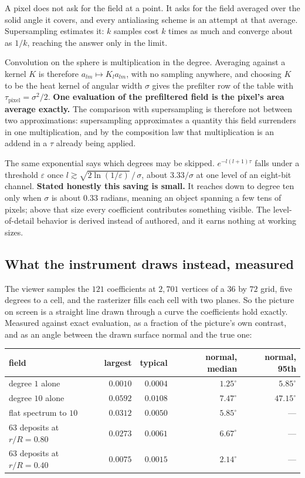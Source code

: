 A pixel does not ask for the field at a point. It asks for the field averaged over the solid angle it covers, and every antialiasing scheme is an attempt at that average. Supersampling estimates it: \(k\) samples cost \(k\) times as much and converge about as \(1/k\), reaching the answer only in the limit.

Convolution on the sphere is multiplication in the degree. Averaging against a kernel \(K\) is therefore \(a_{lm} \mapsto K_l a_{lm}\), with no sampling anywhere, and choosing \(K\) to be the heat kernel of angular width \(\sigma\) gives the prefilter row of the table with \(\tau_{\mathrm{pixel}} = \sigma^2/2\). \textbf{One evaluation of the prefiltered field is the pixel's area average exactly.} The comparison with supersampling is therefore not between two approximations: supersampling approximates a quantity this field surrenders in one multiplication, and by the composition law that multiplication is an addend in a \(\tau\) already being applied.

The same exponential says which degrees may be skipped. \(e^{-l(l+1)\tau}\) falls under a threshold \(\varepsilon\) once \(l \gtrsim \sqrt{2\ln(1/\varepsilon)}\,/\,\sigma\), about \(3.33/\sigma\) at one level of an eight-bit channel. \textbf{Stated honestly this saving is small.} It reaches down to degree ten only when \(\sigma\) is about \(0.33\) radians, meaning an object spanning a few tens of pixels; above that size every coefficient contributes something visible. The level-of-detail behavior is derived instead of authored, and it earns nothing at working sizes.

\subsection{What the instrument draws instead, measured}

The viewer samples the \(121\) coefficients at \(2{,}701\) vertices of a \(36\) by \(72\) grid, five degrees to a cell, and the rasterizer fills each cell with two planes. So the picture on screen is a straight line drawn through a curve the coefficients hold exactly. Measured against exact evaluation, as a fraction of the picture's own contrast, and as an angle between the drawn surface normal and the true one:

\begin{center}
\begin{tabular}{lrrrr}
\toprule
field & largest & typical & normal, median & normal, 95th \\
\midrule
degree \(1\) alone & \(0.0010\) & \(0.0004\) & \(1.25^\circ\) & \(5.85^\circ\) \\
degree \(10\) alone & \(0.0592\) & \(0.0108\) & \(7.47^\circ\) & \(\mathbf{47.15^\circ}\) \\
flat spectrum to \(10\) & \(0.0312\) & \(0.0050\) & \(5.85^\circ\) & --- \\
\(63\) deposits at \(r/R = 0.80\) & \(0.0273\) & \(0.0061\) & \(6.67^\circ\) & --- \\
\(63\) deposits at \(r/R = 0.40\) & \(0.0075\) & \(0.0015\) & \(2.14^\circ\) & --- \\
\bottomrule
\end{tabular}
\end{center}


